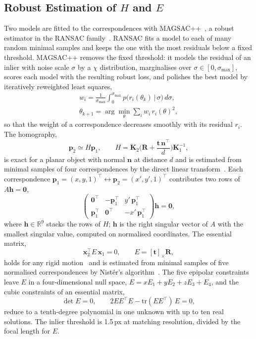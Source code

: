 \documentclass[10pt,a4paper,twocolumn]{article}
\newcommand{\R}{\mathbf{R}}
\newcommand{\tv}{\mathbf{t}}
\newcommand{\K}{\mathbf{K}}
\newcommand{\x}{\mathbf{x}}
\newcommand{\n}{\mathbf{n}}
\begin{document}
\subsection*{Robust Estimation of $H$ and $E$}
Two models are fitted to the correspondences with MAGSAC++~\cite{magsac}, a robust estimator in the RANSAC family~\cite{ransac}. RANSAC fits a model to each of many random minimal samples and keeps the one with the most residuals below a fixed threshold. MAGSAC++ removes the fixed threshold: it models the residual of an inlier with noise scale $\sigma$ by a $\chi$ distribution, marginalises over $\sigma\in[0,\sigma_{\max}]$, scores each model with the resulting robust loss, and polishes the best model by iteratively reweighted least squares,
\begin{gather}
  w_i=\frac{1}{\sigma_{\max}}\int_0^{\sigma_{\max}} p\big(r_i(\theta_k)\,\big|\,\sigma\big)\,d\sigma,\\
  \theta_{k+1}=\arg\min_\theta\sum_i w_i\,r_i(\theta)^2 ,
\end{gather}
so that the weight of a correspondence decreases smoothly with its residual $r_i$. The homography,
\begin{equation}
  \mathbf{p}_2 \simeq H\mathbf{p}_1,\qquad H = \K_2\Big(\R + \frac{\tv\,\n^\top}{d}\Big)\K_1^{-1},
\end{equation}
is exact for a planar object with normal $\n$ at distance $d$ and is estimated from minimal samples of four correspondences by the direct linear transform~\cite{hz}. Each correspondence $\mathbf{p}_1=(x,y,1)^\top\leftrightarrow\mathbf{p}_2=(x',y',1)^\top$ contributes two rows of $A\mathbf{h}=\mathbf{0}$,
\begin{equation}
  \begin{pmatrix} \mathbf{0}^\top & -\mathbf{p}_1^\top & y'\,\mathbf{p}_1^\top\\ \mathbf{p}_1^\top & \mathbf{0}^\top & -x'\,\mathbf{p}_1^\top\end{pmatrix}\mathbf{h}=\mathbf{0},
\end{equation}
where $\mathbf{h}\in\mathbb{R}^9$ stacks the rows of $H$; $\mathbf{h}$ is the right singular vector of $A$ with the smallest singular value, computed on normalised coordinates. The essential matrix,
\begin{equation}
  \x_2^\top E\,\x_1 = 0,\qquad E = [\tv]_\times\R,
\end{equation}
holds for any rigid motion~\cite{longuethiggins} and is estimated from minimal samples of five normalised correspondences by Nist\'er's algorithm~\cite{nister}. The five epipolar constraints leave $E$ in a four-dimensional null space, $E=xE_1+yE_2+zE_3+E_4$, and the cubic constraints of an essential matrix,
\begin{equation}
  \det E = 0,\qquad 2EE^\top E-\mathrm{tr}(EE^\top)\,E=0,
\end{equation}
reduce to a tenth-degree polynomial in one unknown with up to ten real solutions. The inlier threshold is 1.5\,px at matching resolution, divided by the focal length for $E$.
\end{document}
